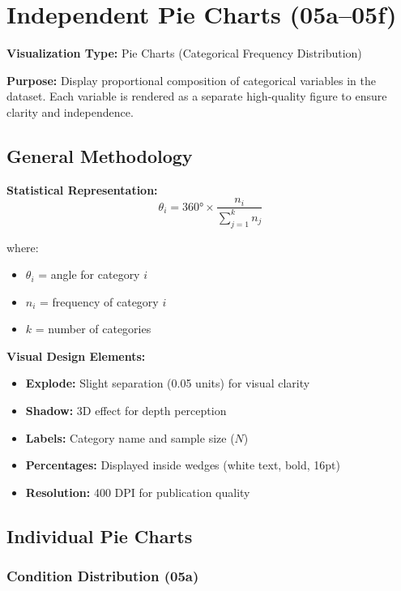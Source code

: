\documentclass[12pt,a4paper]{article}
\begin{document}
\newpage
\section{Independent Pie Charts (05a--05f)}

\textbf{Visualization Type:} Pie Charts (Categorical Frequency Distribution)

\textbf{Purpose:} Display proportional composition of categorical variables in the dataset. Each variable is rendered as a separate high-quality figure to ensure clarity and independence.

\subsection{General Methodology}

\textbf{Statistical Representation:}
\begin{equation}
\theta_i = 360° \times \frac{n_i}{\sum_{j=1}^{k} n_j}
\end{equation}

where:
\begin{itemize}
    \item $\theta_i$ = angle for category $i$
    \item $n_i$ = frequency of category $i$
    \item $k$ = number of categories
\end{itemize}

\textbf{Visual Design Elements:}
\begin{itemize}
    \item \textbf{Explode:} Slight separation (0.05 units) for visual clarity
    \item \textbf{Shadow:} 3D effect for depth perception
    \item \textbf{Labels:} Category name and sample size ($N$)
    \item \textbf{Percentages:} Displayed inside wedges (white text, bold, 16pt)
    \item \textbf{Resolution:} 400 DPI for publication quality
\end{itemize}

\subsection{Individual Pie Charts}

\subsubsection{Condition Distribution (05a)}
\end{document}
